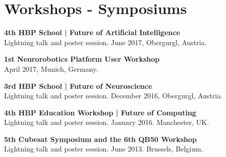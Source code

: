 \documentclass[a4paper]{deedy-resume} %
\begin{document}
\begin{minipage}[b]{0.5\linewidth}
	
	
	\section{Workshops -  Symposiums}
	
	\vspace{5pt}
	\textbf{4th HBP School | Future of Artificial Intelligence} \\
	Lightning talk and poster session. June 2017, Obergurgl, Austria.
	
	\vspace{5pt}
	\textbf{1st Neurorobotics Platform User Workshop} \\
	April 2017, Munich, Germany.

	\vspace{5pt}
	\textbf{3rd HBP School | Future of Neuroscience} \\
	Lightning talk and poster session. December 2016, Obergurgl, Austria.
	
	\vspace{5pt}
	\textbf{4th HBP Education Workshop | Future of Computing} \\
	Lightning talk and poster session. January 2016. Manchester, UK.
	
	\vspace{5pt}
	\textbf{5th Cubesat Symposium and the 6th QB50 Workshop} \\
	Lightning talk and poster session. June 2013. Brussels, Belgium.
	
	\vspace{5pt}
\end{minipage}
\hfill
\end{document}
